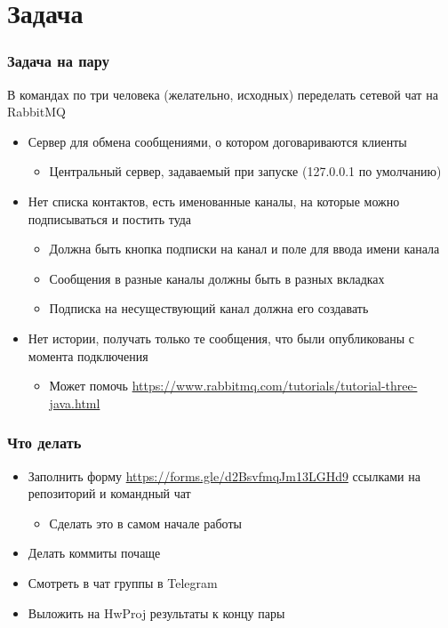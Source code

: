 \documentclass[xetex,mathserif,serif]{beamer}
\begin{document}
	\section{Задача}

	\begin{frame}
		\frametitle{Задача на пару}
		В командах по три человека (желательно, исходных) переделать сетевой чат на RabbitMQ
		\begin{itemize}
			\item Сервер для обмена сообщениями, о котором договариваются клиенты
			\begin{itemize}
				\item Центральный сервер, задаваемый при запуске (127.0.0.1 по умолчанию)
			\end{itemize}
			\item Нет списка контактов, есть именованные каналы, на которые можно подписываться и постить туда
			\begin{itemize}
				\item Должна быть кнопка подписки на канал и поле для ввода имени канала
				\item Сообщения в разные каналы должны быть в разных вкладках
				\item Подписка на несуществующий канал должна его создавать
			\end{itemize}
			\item Нет истории, получать только те сообщения, что были опубликованы с момента подключения
			\begin{itemize}
				\item Может помочь \url{https://www.rabbitmq.com/tutorials/tutorial-three-java.html}
			\end{itemize}
		\end{itemize}
	\end{frame}

    \begin{frame}
        \frametitle{Что делать}
        \begin{itemize}
            \item Заполнить форму \url{https://forms.gle/d2BsvfmqJm13LGHd9} ссылками на репозиторий и командный чат
            \begin{itemize}
                \item Сделать это в самом начале работы
            \end{itemize}
            \item Делать коммиты почаще
            \item Смотреть в чат группы в Telegram
            \item Выложить на HwProj результаты к концу пары
        \end{itemize}
    \end{frame}
\end{document}
